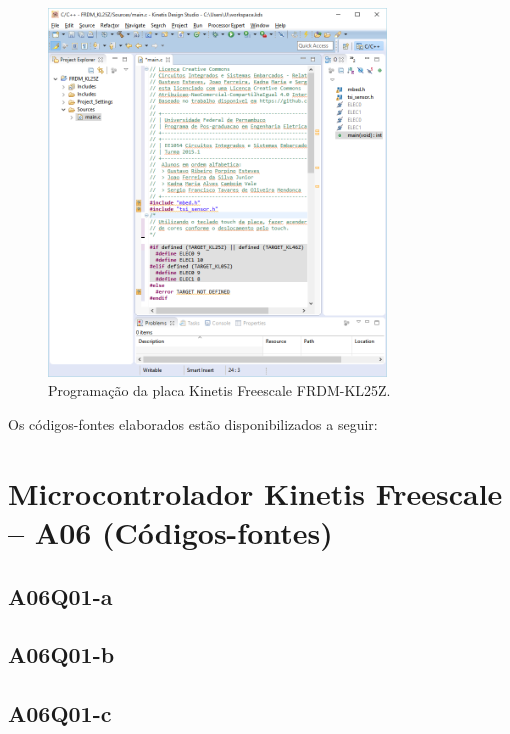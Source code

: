 \documentclass[
	12pt,				%
	openright,			%
  oneside,     %
	a4paper,			%
	english,			%
	french,				%
	spanish,			%
	brazil				%
	]{abntex2}
\begin{document}
\begin{figure}[ht]
  \centering
  \caption{\label{fig:cha:APP_KINETS.png}Programação da placa Kinetis Freescale FRDM-KL25Z.}
  \includegraphics[width=0.8\textwidth]{images/Atividade06/APP_KINETS.png}
\end{figure}

\newpage

Os códigos-fontes elaborados estão disponibilizados a seguir:

\section*{Microcontrolador Kinetis Freescale -- A06 (Códigos-fontes)}
\label{sec:Kinetis-Freescale-A06Q01-a}
\subsection*{A06Q01-a}

\subsection*{A06Q01-b}

\subsection*{A06Q01-c}

\end{document}
